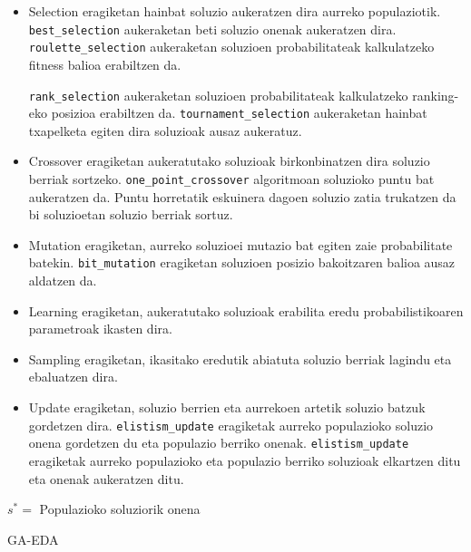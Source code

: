 \documentclass[sigconf]{acmart}
\begin{document}
\begin{itemize}
    \item Selection eragiketan hainbat soluzio aukeratzen dira aurreko populaziotik. \texttt{best\_selection} aukeraketan beti soluzio onenak aukeratzen dira.  \texttt{roulette\_selection} aukeraketan soluzioen probabilitateak kalkulatzeko fitness balioa erabiltzen da.
    
    \texttt{rank\_selection} aukeraketan soluzioen probabilitateak kalkulatzeko ranking-eko posizioa erabiltzen da. \texttt{tournament\_selection} aukeraketan hainbat txapelketa egiten dira soluzioak ausaz aukeratuz.
    \item Crossover eragiketan aukeratutako soluzioak birkonbinatzen dira soluzio berriak sortzeko. \texttt{one\_point\_crossover} algoritmoan soluzioko puntu bat aukeratzen da. Puntu horretatik eskuinera dagoen soluzio zatia trukatzen da bi soluzioetan soluzio berriak sortuz.
    \item Mutation eragiketan, aurreko soluzioei mutazio bat egiten zaie probabilitate batekin. \texttt{bit\_mutation} eragiketan soluzioen posizio bakoitzaren balioa ausaz aldatzen da.
    \item Learning eragiketan, aukeratutako soluzioak erabilita eredu probabilistikoaren parametroak ikasten dira.
    \item Sampling eragiketan, ikasitako eredutik abiatuta soluzio berriak lagindu eta ebaluatzen dira.
    \item Update eragiketan, soluzio berrien eta aurrekoen artetik soluzio batzuk gordetzen dira. \texttt{elistism\_update} eragiketak aurreko populazioko soluzio onena gordetzen du eta populazio berriko onenak. \texttt{elistism\_update} eragiketak aurreko populazioko eta populazio berriko soluzioak elkartzen ditu eta onenak aukeratzen ditu.
\end{itemize}

\begin{algorithm}
    $s^* =$ Populazioko soluziorik onena
    \caption{GA-EDA}
    \label{alg:ga_eda}
\end{algorithm}
\end{document}
